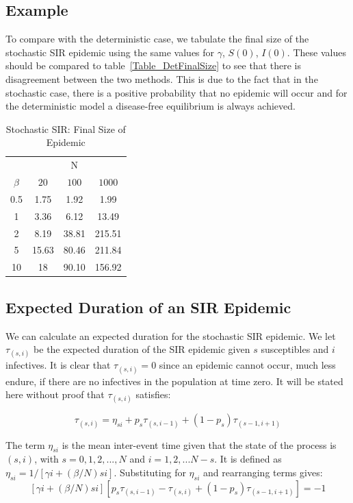 \documentclass[reqno,11pt]{amsart}
\begin{document}
\subsection{Example}
To compare with the deterministic case, we tabulate the final size of the stochastic SIR epidemic using the same values for $\gamma$, $S(0)$, $I(0)$. These values should be compared to table~\ref{Table_DetFinalSize} to see that there is disagreement between the two methods. This is due to the fact that in the stochastic case, there is a positive probability that no epidemic will occur and for the deterministic model a disease-free equilibrium is always achieved.
\begin{table}[ht]
	\begin{tabular}{|c||ccc|}
		\hline
	 	   &           &    N       &			\\ \cline{2-4}
	$\beta$ &  $20$ & $100$  	& $1000$   		\\
	\hline
	0.5 & 1.75	& 1.92 	& 1.99   		\\
	1   & 3.36 	& 6.12 	& 13.49  		\\
	2   & 8.19 	& 38.81 	& 215.51 		\\
	5   & 15.63 	& 80.46 	& 211.84  		\\
	10  & 18 	& 90.10 	& 156.92  		\\
	\hline
	\end{tabular}
	\caption{Stochastic SIR: Final Size of Epidemic}
	\label{Table_StochFinalSize}
\end{table}
%
%
%
%
\subsection{Expected Duration of an SIR Epidemic}
We can calculate an expected duration for the stochastic SIR epidemic. We let $\tau _{(s,i)} $ be the expected duration of the SIR epidemic given $ s $ susceptibles and $ i $ infectives. It is clear that $\tau  _{(s,i)} = 0  $ since an epidemic cannot occur, much less endure, if there are no infectives in the population at time zero. It will be stated here without proof that $\tau _{(s,i)}$ satisfies:

\begin{equation*}
\tau _{(s,i)}  = \eta _{si} + p_s \tau _{(s,i-1)} + (1-p_s) \tau _{(s-1,i+1)}
\end{equation*}

The term $\eta _{si}$ is the mean inter-event time given that the state of the process is $(s,i)$, with $s=0,1,2,...,N$ and $i=1,2,...N-s$. It is defined as $\eta _{si} = 1/ \left [ \gamma i + (\beta /N) si    \right ]   $. Substituting for $\eta _{si}$ and rearranging terms gives:
\begin{equation}
\left [ \gamma i + ( \beta / N) s i \right ] \left [ p_s \tau _{(s,i-1)} - \tau _{(s,i)} + (1-p_s) \tau _{(s-1,i+1)} \right ]  = -1
\end{equation}
\end{document}
